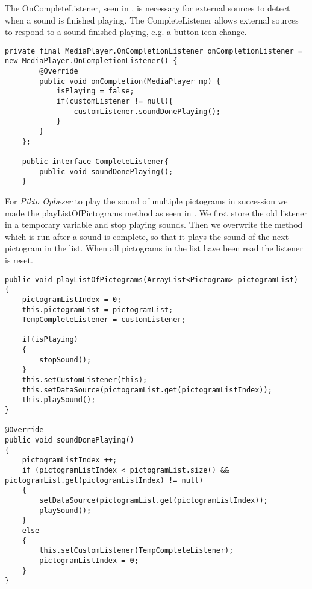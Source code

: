 The OnCompleteListener, seen in , is necessary for external sources to detect when a sound is finished playing. The CompleteListener allows external sources to respond to a sound finished playing, e.g. a button icon change.

\begin{lstlisting}[label=lst:completelistener, caption = {onCompleteListener method of PictoMediaPlayer}]
private final MediaPlayer.OnCompletionListener onCompletionListener = new MediaPlayer.OnCompletionListener() {
        @Override
        public void onCompletion(MediaPlayer mp) {
            isPlaying = false;
            if(customListener != null){
                customListener.soundDonePlaying();
            }
        }
    };

    public interface CompleteListener{
        public void soundDonePlaying();
    }
\end{lstlisting}

For \textit{Pikto Oplæser} to play the sound of multiple pictograms in succession we made the playListOfPictograms method as seen in . 
We first store the old listener in a temporary variable and stop playing sounds. Then we overwrite the method which is run after a sound is complete, so that it plays the sound of the next pictogram in the list. When all pictograms in the list have been read the listener is reset. %

\begin{lstlisting}[label={lst:playlist}, caption = {playListOfPictograms method of PictoMediaPlayer.}]
public void playListOfPictograms(ArrayList<Pictogram> pictogramList)
{
    pictogramListIndex = 0;
    this.pictogramList = pictogramList;
    TempCompleteListener = customListener;

    if(isPlaying)
    {
        stopSound();
    }
    this.setCustomListener(this);
    this.setDataSource(pictogramList.get(pictogramListIndex));
    this.playSound();
}

@Override
public void soundDonePlaying()
{
    pictogramListIndex ++;
    if (pictogramListIndex < pictogramList.size() && pictogramList.get(pictogramListIndex) != null)
    {
        setDataSource(pictogramList.get(pictogramListIndex));
        playSound();
    }
    else
    {
        this.setCustomListener(TempCompleteListener);
        pictogramListIndex = 0;
    }
}
\end{lstlisting}

